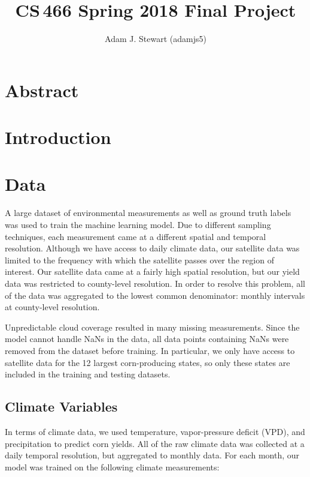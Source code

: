 \documentclass[letterpaper]{article}
\begin{document}
\title{CS\,466 Spring 2018 Final Project}
\author{Adam J. Stewart (adamjs5)}

\maketitle

\section{Abstract}

\section{Introduction}

\section{Data}

A large dataset of environmental measurements as well as ground truth labels was used to train the machine learning model. Due to different sampling techniques, each measurement came at a different spatial and temporal resolution. Although we have access to daily climate data, our satellite data was limited to the frequency with which the satellite passes over the region of interest. Our satellite data came at a fairly high spatial resolution, but our yield data was restricted to county-level resolution. In order to resolve this problem, all of the data was aggregated to the lowest common denominator: monthly intervals at county-level resolution.

Unpredictable cloud coverage resulted in many missing measurements. Since the model cannot handle NaNs in the data, all data points containing NaNs were removed from the dataset before training. In particular, we only have access to satellite data for the 12 largest corn-producing states, so only these states are included in the training and testing datasets.

\subsection{Climate Variables}

In terms of climate data, we used temperature, vapor-pressure deficit (VPD), and precipitation to predict corn yields. All of the raw climate data was collected at a daily temporal resolution, but aggregated to monthly data. For each month, our model was trained on the following climate measurements:
\end{document}
